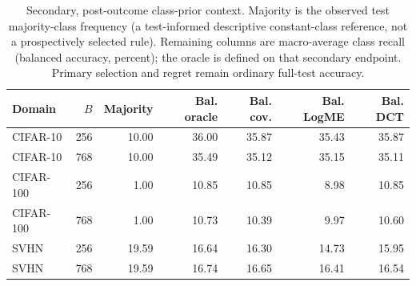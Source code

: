 \begin{table}[tb]\centering\small
\caption{Secondary, post-outcome class-prior context. Majority is the observed test majority-class frequency (a test-informed descriptive constant-class reference, not a prospectively selected rule). Remaining columns are macro-average class recall (balanced accuracy, percent); the oracle is defined on that secondary endpoint. Primary selection and regret remain ordinary full-test accuracy.}\label{tab:balance}
\begin{tabular}{lrrrrrr}\toprule
Domain & $B$ & Majority & Bal. oracle & Bal. cov. & Bal. LogME & Bal. DCT\\\midrule
CIFAR-10 & 256 & 10.00 & 36.00 & 35.87 & 35.43 & 35.87\\
CIFAR-10 & 768 & 10.00 & 35.49 & 35.12 & 35.15 & 35.11\\
CIFAR-100 & 256 & 1.00 & 10.85 & 10.85 & 8.98 & 10.85\\
CIFAR-100 & 768 & 1.00 & 10.73 & 10.39 & 9.97 & 10.60\\
SVHN & 256 & 19.59 & 16.64 & 16.30 & 14.73 & 15.95\\
SVHN & 768 & 19.59 & 16.74 & 16.65 & 16.41 & 16.54\\
\bottomrule\end{tabular}
\end{table}
